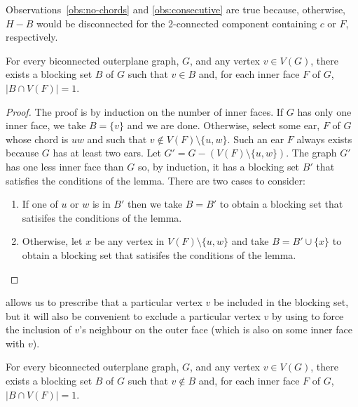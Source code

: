 \documentclass{cccg16}
\begin{document}
Observations~\ref{obs:no-chords} and \ref{obs:consecutive} are true
because, otherwise, $H-B$ would be disconnected for the 2-connected
component containing $c$ or $F$, respectively.



\begin{lem}
  For every biconnected outerplane graph, $G$, and any vertex $v\in
  V(G)$, there exists a blocking set $B$ of $G$ such that $v\in B$ and,
  for each inner face $F$ of $G$, $|B\cap V(F)|=1$.
\end{lem}

\begin{proof}
  The proof is by induction on the number of inner faces.  If $G$ has
  only one inner face, we take $B=\{v\}$ and we are done.  Otherwise,
  select some ear, $F$ of $G$ whose chord is $uw$ and such that
  $v\not\in V(F)\setminus\{u,w\}$. Such an ear $F$ always exists because
  $G$ has at least two ears.  Let $G'=G-(V(F)\setminus\{u,w\})$.
  The graph $G'$ has one less inner face than $G$ so, by induction, it
  has a blocking set $B'$ that satisfies the conditions of the lemma.
  There are two cases to consider:
  \begin{enumerate}
    \item If one of $u$ or $w$ is in $B'$ then we take $B=B'$ to obtain
      a blocking set that satisifes the conditions of the lemma.

    \item Otherwise, let $x$ be any vertex in $V(F)\setminus\{u,w\}$ and
      take $B=B'\cup\{x\}$ to obtain a blocking set that satisifes the
      conditions of the lemma. \qedhere
  \end{enumerate}
\end{proof}

 allows us to prescribe that a particular vertex
$v$ be included in the blocking set, but it will also be convenient to
exclude a particular vertex $v$ by using  to force
the inclusion of $v$'s neighbour on the outer face (which is also on
some inner face with $v$).

\begin{cor}
  For every biconnected outerplane graph, $G$, and any vertex $v\in
  V(G)$, there exists a blocking set $B$ of $G$ such that $v\not\in B$ and,
  for each inner face $F$ of $G$, $|B\cap V(F)|=1$.
\end{cor}
\end{document}
